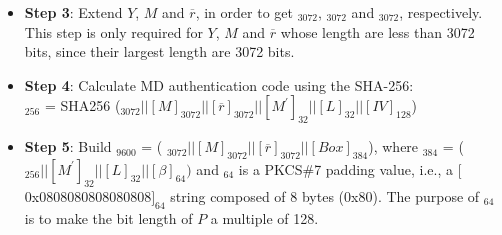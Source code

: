 \documentclass[main\_\_EN.tex]{subfiles}
\begin{document}
\begin{itemize}
    \item {\bfseries Step 3}: Extend \begin{math}Y\end{math}, \begin{math}M\end{math} and \begin{math}\overline{r}\end{math}, in order to get \begin{math}[Y]_{3072}\end{math}, \begin{math}[M]_{3072}\end{math} and \begin{math}[\overline{r}]_{3072}\end{math}, respectively. This step is only required for \begin{math}Y\end{math}, \begin{math}M\end{math} and \begin{math}\overline{r}\end{math} whose length are less than 3072 bits, since their largest length are 3072 bits.
       
    
    \item {\bfseries Step 4}: Calculate MD authentication code using the SHA-256:\\
                \begin{math}[MD]_{256}\end{math} = SHA256 (\begin{math} 
                [Y]_{3072} ||
                [M]_{3072} ||
                [\overline{r}]_{3072} ||
                [M^{\prime}]_{32} ||
                [L]_{32} ||
                [IV]_{128} 
            \end{math})

    \item {\bfseries Step 5}: Build \begin{math}[P]_{9600}\end{math} = (
            \begin{math}
                [Y]_{3072} ||
                [M]_{3072} ||
                [\overline{r}]_{3072} ||
                [Box]_{384}
            \end{math}), where
            \begin{math}[Box]_{384}\end{math} = (
            \begin{math}
                [MD]_{256} ||
                [M^{\prime}]_{32} ||
                [L]_{32} ||
                [\beta]_{64}) 
            \end{math} and
            \begin{math}[\beta]_{64} \end{math} is a PKCS\#7 padding value, i.e., a $[$0x0808080808080808$]_{64}$ string composed of 8 bytes (0x80). The purpose of \begin{math}[\beta]_{64}\end{math} is to make the bit length of \begin{math}P\end{math} a multiple of 128.
    

\end{itemize}
\end{document}

